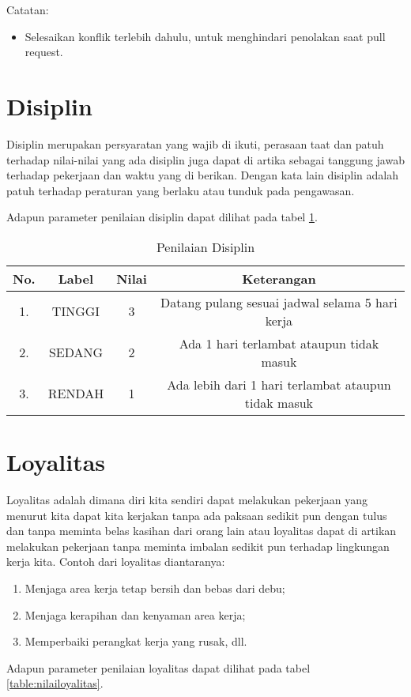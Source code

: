 Catatan:
\begin{itemize}
\item Selesaikan konflik terlebih dahulu, untuk menghindari penolakan saat pull request.
\end{itemize}

\section{Disiplin}
Disiplin merupakan persyaratan yang wajib di ikuti, perasaan taat dan patuh terhadap nilai-nilai yang ada disiplin juga dapat di artika sebagai tanggung jawab terhadap pekerjaan dan waktu yang di berikan. Dengan kata lain disiplin adalah patuh terhadap peraturan yang berlaku
atau tunduk pada pengawasan.

Adapun parameter penilaian disiplin dapat dilihat pada tabel \ref{table:nilaidisiplin}.

\begin{table}[H]
\caption{Penilaian Disiplin}
\centering
\begin{tabular}{|c|c|c|c|}
\hline
\textbf{No.}&\textbf{Label}&\textbf{Nilai}&\textbf{Keterangan}\\
\hline
1.&TINGGI&3&Datang pulang sesuai jadwal selama 5 hari kerja\\
\hline
2.&SEDANG&2&Ada 1 hari terlambat ataupun tidak masuk\\
\hline
3.&RENDAH&1&Ada lebih dari 1 hari terlambat ataupun tidak masuk\\
\hline
\end{tabular}
\label{table:nilaidisiplin}
\end{table}

\section{Loyalitas}
Loyalitas adalah dimana diri kita sendiri dapat melakukan pekerjaan yang menurut kita dapat kita kerjakan tanpa ada paksaan sedikit pun
dengan tulus dan tanpa meminta belas kasihan dari orang lain atau loyalitas dapat di artikan melakukan pekerjaan tanpa meminta imbalan sedikit pun terhadap lingkungan kerja kita.
Contoh dari loyalitas diantaranya:
\begin{enumerate}
\item Menjaga area kerja tetap bersih dan bebas dari debu;
\item Menjaga kerapihan dan kenyaman area kerja;
\item Memperbaiki perangkat kerja yang rusak, dll.
\end{enumerate}
Adapun parameter penilaian loyalitas dapat dilihat pada tabel \ref{table:nilailoyalitas}.

